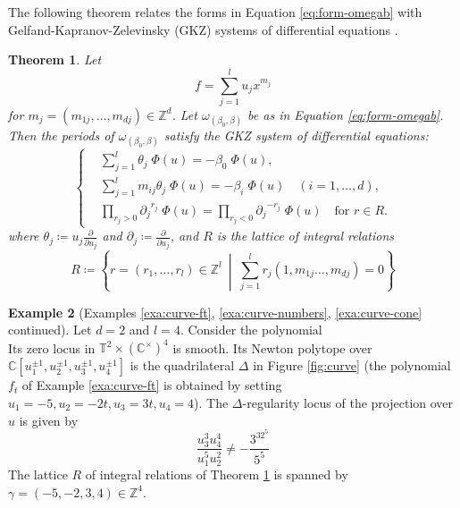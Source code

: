 \documentclass[11pt, reqno]{amsart}
\theoremstyle{plain}
\newtheorem{thm}{Theorem}[section]
\theoremstyle{definition}
\newtheorem{example}[thm]{Example}
\newcommand{\CC}{\mathbb{C}}
\newcommand{\Z}{\mathbb{Z}}
\newcommand{\ZZ}{\mathbb{Z}}
\newcommand{\TT}{\mathbb{T}}
\begin{document}
The following theorem relates the forms in Equation \eqref{eq:form-omegab} with Gelfand-Kapranov-Zelevinsky (GKZ) systems of differential equations \cite{GKZ}.  

\begin{thm}{\cite[Theorem 14.2]{Batyrev-tori}}\label{theo:form-GKZ}
Let \[f= \sum_{j=1}^l u_j x^{m_j}\] for $m_j =(m_{1j},\dots,m_{dj}) \in \Z^d$. Let $\omega_{(\beta_0, \beta)}$ be as in Equation \eqref{eq:form-omegab}.
Then the \textit{periods} of $\omega_{(\beta_0,\beta)}$ satisfy the GKZ system of differential equations:
\begin{equation}\label{eq:form-GKZ}
\left\{
\begin{aligned}
& \sum_{j=1}^l \theta_j \; \Phi(u) = -\beta_0 \; \Phi(u),\\
& \sum_{j=1}^l m_{ij} \theta_j \; \Phi(u) = -\beta_i \; \Phi(u)
\quad (i=1,\dots,d),\\
& \prod_{r_j>0} {\partial_j}^{r_j} \; \Phi(u)
= \prod_{r_j<0}{\partial_j}^{-r_j} \;  \Phi(u)
\quad \text{for } r \in R.
\end{aligned}
\right.
\end{equation}
where $\theta_j \coloneqq u_j \frac{\partial }{\partial u_j}$  and 
$\partial_j \coloneqq \frac{\partial }{\partial u_j}$, 
and $R$ is the lattice of integral relations
\begin{equation}
R \coloneqq \left \{ r=(r_1,\dots,r_l) \in \Z^l \ \middle| \  \sum_{j=1}^l r_j(1,m_{1j} \dots, m_{dj})=0 \right\}
\end{equation}
\end{thm}

\smallskip


\begin{example}[Examples \ref{exa:curve-ft}, \ref{exa:curve-numbers}, \ref{exa:curve-cone} continued]
\label{exa:curve-u}
Let $d=2$ and $l=4$. Consider the polynomial \begin{equation}
\label{eq:curve-bigF}
\end{equation}
 Its zero locus in $\TT^2 \times (\CC^\times)^4$ is smooth. Its Newton polytope over $\CC[u_1^{\pm1}, u_2^{\pm1}, u_3^{\pm1}, u_4^{\pm1}]$ is the quadrilateral $\Delta$ in Figure \ref{fig:curve} (the polynomial $f_t$ of Example \ref{exa:curve-ft} is obtained by setting $u_1=-5, u_2=-2t, u_3=3t, u_4=4$).
The $\Delta$-regularity locus of the projection over $u$ is given by 
\begin{equation}
\label{eq:curve-value}
\frac{u_3^{3}u_4^{4}}{u_1^5u_2^2} \neq -\frac{3^32^5 }{5^5}
\end{equation} 
The lattice $R$ of integral relations of Theorem \ref{theo:form-GKZ} is spanned by $\gamma=(-5,-2,3,4) \in \ZZ^4$.

\end{example}
\end{document}
